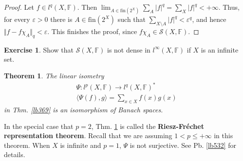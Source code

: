 \documentclass[12pt,b5paper,notitlepage]{article}
\theoremstyle{definition}
\newtheorem{exe}[df]{Exercise}
\theoremstyle{plain}
\newtheorem{thm}[df]{Theorem}
\newcommand{\mc}{\mathcal}
\newcommand{\bk}[1]{\langle {#1}\rangle}
\newcommand{\fin}{\mathrm{fin}}
\newcommand{\Fbb}{\mathbb F}
\newcommand{\eps}{\varepsilon}
\numberwithin{equation}{section}
\begin{document}
\begin{proof}
Let $f\in l^q(X,\Fbb)$. Then $\lim_{A\in\fin(2^X)}\sum_A|f|^q=\sum_X |f|^q<+\infty$. Thus, for every $\eps>0$ there is $A\in\fin(2^X)$ such that $\sum_{X\setminus A}|f|^q<\eps^q$, and hence $\Vert f-f\chi_A\Vert_q<\eps$. This finishes the proof, since $f\chi_A\in\mc S(X,\Fbb)$.
\end{proof}


\begin{exe}
Show that $\mc S(X,\Fbb)$ is not dense in $l^\infty(X,\Fbb)$ if $X$ is an infinite set.
\end{exe}

\begin{thm}\label{lb527}
The linear isometry
\begin{gather*}
\Psi:l^p(X,\Fbb)\rightarrow l^q(X,\Fbb)^*\\
\bk{\Psi(f),g}=\sum_{x\in X}f(x)g(x)
\end{gather*}
in Thm. \ref{lb369} is an isomorphism of Banach spaces.
\end{thm}

In the special case that $p=2$, Thm. \ref{lb527} is called the \textbf{Riesz-Fr\'echet representation theorem}.  Recall that we are assuming $1<p\leq+\infty$ in this theorem. When $X$ is infinite and $p=1$, $\Psi$ is not surjective. See Pb. \ref{lb532} for details.

\end{document}
